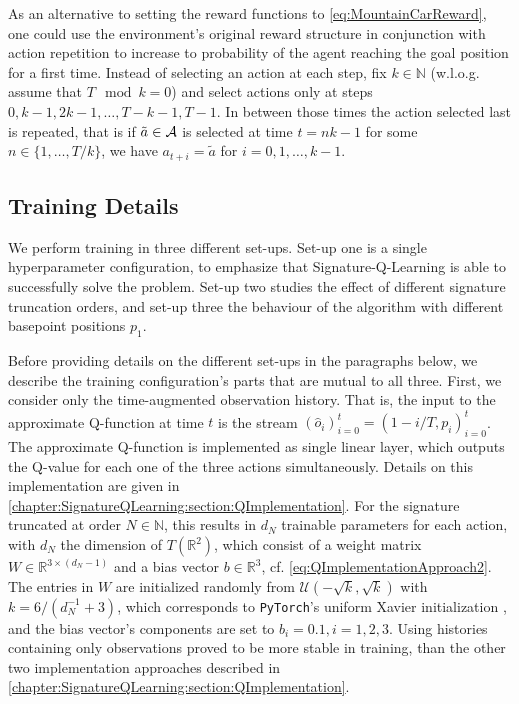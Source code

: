 \documentclass[
    a4paper,
    11pt,
    bibliography=totoc,
    listof=totoc,      
    headinclude=true,
    cleardoublepage=empty,
]{scrbook}
\theoremstyle{plain}
\theoremstyle{definition}
\theoremstyle{remark}
\newcommand{\SetR}{\mathbb R}
\newcommand{\SetN}{\mathbb N}
\newcommand{\SpaceA}{{\cal A}}
\begin{document}
As an alternative to setting the reward functions to
\eqref{eq:MountainCarReward}, one could use the environment's original reward
structure in conjunction with action repetition to increase to probability of
the agent reaching the goal position for a first time. Instead of selecting an
action at each step, fix $k\in\SetN$ (w.l.o.g. assume that $T\mod k = 0$) and
select actions only at steps $0, k-1, 2k-1, \dots, T-k-1,T-1$. In between
those times the action selected last is repeated, that is if $\tilde a
\in\SpaceA$ is selected at time $t=nk-1$ for some $n\in \{1,\dots,T/k\}$, we
have $a_{t+i} = \tilde a$ for $i=0,1,\dots,k-1$.

\subsection{Training Details} 
\label{chapter:Experiments:section:MountainCar:sub:TrainingDetails}

We perform training in three different set-ups. Set-up one is a single
hyperparameter configuration, to emphasize that Signature-Q-Learning is able
to successfully solve the problem. Set-up two studies the effect of different
signature truncation orders, and set-up three the behaviour of the algorithm
with different basepoint positions $p_1$. 

Before providing details on the different set-ups in the paragraphs below, we 
describe the training configuration's parts that are mutual to all three.
First, we consider only the time-augmented observation history. That is, the
input to the approximate Q-function at time $t$ is the stream
$(\hat{o}_i)_{i=0}^t = (1 - i/T, p_i)_{i=0}^t$. The approximate Q-function is
implemented as single linear layer, which outputs the Q-value for each one of
the three actions simultaneously. Details on this implementation are given in 
\cref{chapter:SignatureQLearning:section:QImplementation}. For the signature
truncated at order $N\in\SetN$, this results in $d_N$ trainable parameters for
each action, with $d_N$ the dimension of $T(\SetR^2)$, which consist of a weight
matrix $W \in \SetR^{3\times (d_N-1)}$ and a bias vector $b\in\SetR^3$, cf.
\eqref{eq:QImplementationApproach2}. The entries in $W$ are initialized
randomly from $\mathcal{U}(-\sqrt{k},\sqrt{k})$ with $k=6/(d_N^{-1}+3)$, which
corresponds to \texttt{PyTorch}'s uniform Xavier initialization
\cite{glorot2010_udtdfnn}, and the bias vector's components are set to
$b_i=0.1, i=1,2,3$. Using histories containing only observations proved to be
more stable in training, than the other two implementation approaches described
in \cref{chapter:SignatureQLearning:section:QImplementation}. 
\end{document}
